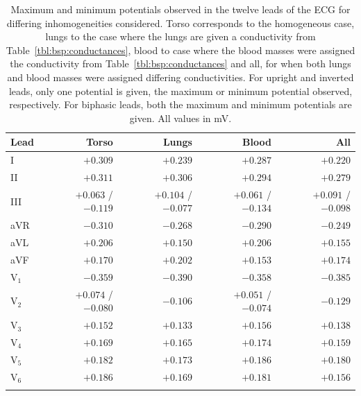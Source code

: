 \begin{table}
    \caption[Maximum and minimum potentials observed in ECG leads]{
        Maximum and minimum potentials observed in the twelve leads of the ECG
        for differing inhomogeneities considered.
        Torso corresponds to the homogeneous case, lungs to the case where the
        lungs are given a conductivity from Table~\ref{tbl:bsp:conductances},
        blood to case where the blood masses were assigned the conductivity from
        Table~\ref{tbl:bsp:conductances} and all, for when both lungs and blood
        masses were assigned differing conductivities.
        For upright and inverted leads, only one potential is given, the maximum
        or minimum potential observed, respectively.
        For biphasic leads, both the maximum and minimum potentials are given.
        All values in mV.
    }
    \begin{tabular}{ l r r r r }
    \toprule
    Lead & Torso & Lungs & Blood & All \\
    \midrule
    I                       & $+0.309$ & $+0.239$ & $+0.287$ & $+0.220$ \\
    II                      & $+0.311$ & $+0.306$ & $+0.294$ & $+0.279$ \\
    III                     & $+0.063$ / $-0.119$ & $+0.104$ / $-0.077$ & $+0.061$ / $-0.134$ & $+0.091$ / $-0.098$ \\
    aVR                     & $-0.310$ & $-0.268$ & $-0.290$ & $-0.249$ \\
    aVL                     & $+0.206$ & $+0.150$ & $+0.206$ & $+0.155$ \\
    aVF                     & $+0.170$ & $+0.202$ & $+0.153$ & $+0.174$ \\
    $\text{V}_{\text{1}}$   & $-0.359$ & $-0.390$ & $-0.358$ & $-0.385$ \\
    $\text{V}_{\text{2}}$   & $+0.074$ / $-0.080$ & $-0.106$ & $+0.051$ / $-0.074$ & $-0.129$ \\
    $\text{V}_{\text{3}}$   & $+0.152$ & $+0.133$ & $+0.156$ & $+0.138$ \\
    $\text{V}_{\text{4}}$   & $+0.169$ & $+0.165$ & $+0.174$ & $+0.159$ \\
    $\text{V}_{\text{5}}$   & $+0.182$ & $+0.173$ & $+0.186$ & $+0.180$ \\
    $\text{V}_{\text{6}}$   & $+0.186$ & $+0.169$ & $+0.181$ & $+0.156$ \\
    \bottomrule
    \label{tbl:bsp:ecg}
    \end{tabular}
\end{table}

